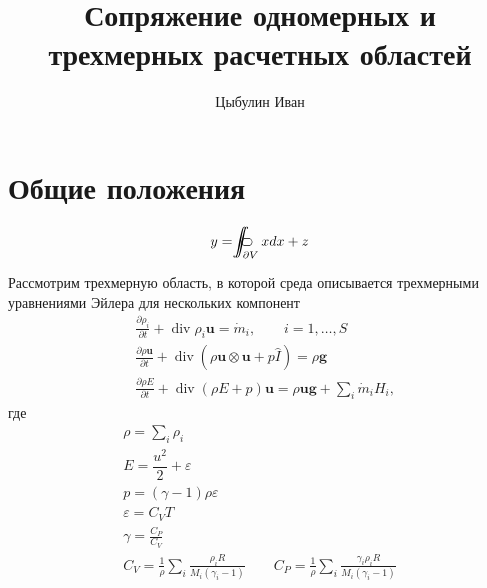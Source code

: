 \documentclass[12pt]{article}
\author{Цыбулин Иван}
\title{Сопряжение одномерных и трехмерных расчетных областей}
\newcommand{\pd}[2]{\frac{\partial #1}{\partial #2}}
\renewcommand{\div}{\operatorname{div}}
\newcommand{\bvec}[1]{\boldsymbol{\mathbf{#1}}}
\newcommand{\oiint}{%
{}\subset\hspace{-6pt}\supset\hspace{-17.8pt}%
\int\hspace{-10pt}\int%
}%
\begin{document}
\maketitle

\section{Общие положения}
$$
y = \oiint_{\partial V} x dx + z
$$

Рассмотрим трехмерную область, в которой среда описывается трехмерными уравнениями Эйлера для нескольких компонент
\begin{equation}
\begin{aligned}
&\pd{\rho_i}{t} + \div \rho_i \bvec{u} = \dot m_i, \qquad i = 1, \dots, S\\
&\pd{\rho \bvec{u}}{t} + \div \left(\rho \bvec{u} \otimes \bvec{u} + p\hat I\right) = \rho \bvec{g}\\
&\pd{\rho E}{t} + \div (\rho E + p)\bvec{u} = \rho \bvec{u}\bvec{g} + \sum_i \dot m_i H_i,
\end{aligned}
\end{equation}
где 
\begin{gather*}
\rho = \sum_i \rho_i\\
E = \dfrac{u^2}{2} + \varepsilon\\
p = (\gamma - 1)\rho\varepsilon\\
\varepsilon = C_V T\\
\gamma = \frac{C_P}{C_V}\\
C_{V} = \frac{1}{\rho}\sum_i \frac{\rho_i R}{M_i (\gamma_i- 1)}\qquad
C_{P} = \frac{1}{\rho}\sum_i \frac{\gamma_i\rho_i R}{M_i (\gamma_i- 1)}
\end{gather*}
\end{document}
